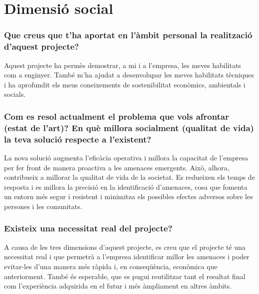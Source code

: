 \section{Dimensió social}

\subsubsection{Que creus que t'ha aportat en l'àmbit personal la realització d'aquest projecte?}
Aquest projecte ha permès demostrar, a mi i a l'empresa, les meves habilitats com a enginyer. També m'ha ajudat a desenvolupar les meves habilitats tècniques i ha aprofundit els meus coneixements de sostenibilitat econòmics, ambientals i socials.

\subsubsection{Com es resol actualment el problema que vols afrontar (estat de l'art)? En què millora socialment (qualitat de vida) la teva solució respecte a l'existent?}
La nova solució augmenta l'eficàcia operativa i millora la capacitat de l'empresa per fer front de manera proactiva a les amenaces emergents. Això, alhora, contribueix a millorar la qualitat de vida de la societat. Es redueixen els temps de resposta i es millora la precisió en la identificació d'amenaces, cosa que fomenta un entorn més segur i resistent i minimitza els possibles efectes adversos sobre les persones i les comunitats.

\subsubsection{Existeix una necessitat real del projecte?}
A causa de les tres dimensions d'aquest projecte, es creu que el projecte té una necessitat real i que permetrà a l'empresa identificar millor les amenaces i poder evitar-les d'una manera més ràpida i, en conseqüència, econòmica que anteriorment. També és esperable, que es pugui reutilitzar tant el resultat final com l'experiència adquirida en el futur i més àmpliament en altres àmbits.
